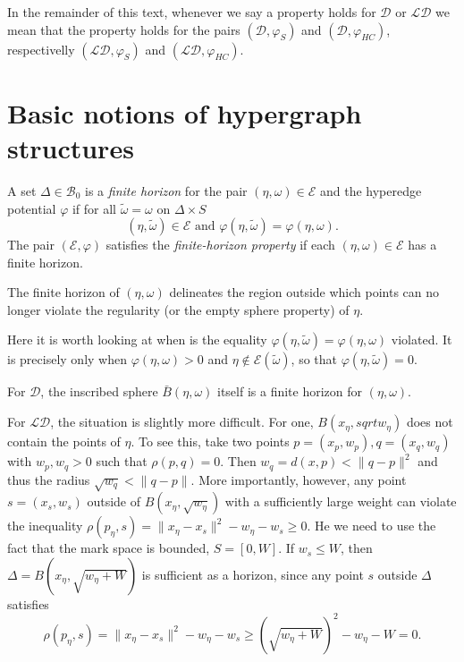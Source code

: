 \documentclass[12pt,a4paper]{report}
\begin{document}

In the remainder of this text, whenever we say a property holds for $\mathcal D$ or $\mathcal {LD}$ we mean that the property holds for the pairs $(\mathcal D,\varphi_S)$ and $(\mathcal D,\varphi_{HC})$, respectivelly $(\mathcal {LD},\varphi_S)$ and $(\mathcal {LD},\varphi_{HC})$.

\section{Basic notions of hypergraph structures}


A set $\Delta \in \mathcal B_0$ is a \textit{finite horizon} for the pair $(\eta,\omega) \in \mathcal E$ and the hyperedge potential $\varphi$ if for all $\tilde\omega = \omega$ on $\Delta\times S$ 
$$(\eta,\tilde\omega)\in\mathcal E \text{ and } \varphi(\eta,\tilde\omega) = \varphi(\eta,\omega). $$
The pair $(\mathcal E, \varphi)$ satisfies the \textit{finite-horizon property} if each $(\eta,\omega)\in \mathcal E$ has a finite horizon.

The finite horizon of $(\eta,\omega)$ delineates the region outside which points can no longer violate the regularity (or the empty sphere property) of $\eta$. 

Here it is worth looking at when is the equality $\varphi(\eta,\tilde\omega) = \varphi(\eta,\omega)$ violated. It is precisely only when $\varphi(\eta,\omega)>0$ and $\eta \notin\mathcal E(\tilde\omega)$, so that $\varphi(\eta,\tilde\omega)=0$.

For $\mathcal D$, the inscribed sphere $\bar B(\eta,\omega)$ itself is a finite horizon for $(\eta,\omega)$.

For $\mathcal {LD}$, the situation is slightly more difficult. For one, $B(x_\eta, sqrt{w_\eta})$ does not contain the points of $\eta$. To see this, take two points $p=(x_p,w_p),q=(x_q,w_q)$ with $w_p,w_q>0$ such that $\rho(p,q)=0$. Then $w_q = d(x,p) < \|q-p\|^2$ and thus the radius $\sqrt{w_q} < \|q-p\|$. More importantly, however, any point $s=(x_s,w_s)$ outside of $B(x_\eta, \sqrt{w_\eta})$ with a sufficiently large weight can violate the inequality $\rho(p_\eta,s) = \|x_\eta - x_s\|^2 - w_\eta - w_s \geq 0$. He we need to use the fact that the mark space is bounded, $S=[0,W]$. If $w_s \leq W$, then $\Delta = B(x_\eta, \sqrt{w_\eta + W})$ is sufficient as a horizon, since any point $s$ outside $\Delta$ satisfies
$$\rho(p_\eta, s) = \|x_\eta - x_s\|^2 - w_\eta - w_s \geq (\sqrt{w_\eta+W})^2-w_\eta-W = 0.$$ 
\end{document}
